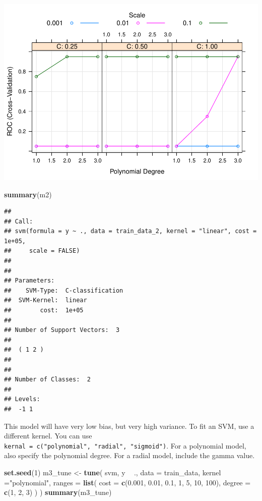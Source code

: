 \documentclass[
]{book}
\newenvironment{Shaded}{\begin{snugshade}}{\end{snugshade}}
\newcommand{\DataTypeTok}[1]{\textcolor[rgb]{0.13,0.29,0.53}{#1}}
\newcommand{\DecValTok}[1]{\textcolor[rgb]{0.00,0.00,0.81}{#1}}
\newcommand{\FloatTok}[1]{\textcolor[rgb]{0.00,0.00,0.81}{#1}}
\newcommand{\KeywordTok}[1]{\textcolor[rgb]{0.13,0.29,0.53}{\textbf{#1}}}
\newcommand{\NormalTok}[1]{#1}
\newcommand{\OperatorTok}[1]{\textcolor[rgb]{0.81,0.36,0.00}{\textbf{#1}}}
\newcommand{\StringTok}[1]{\textcolor[rgb]{0.31,0.60,0.02}{#1}}
\begin{document}
\includegraphics{data-sci_files/figure-latex/unnamed-chunk-106-1.pdf}

\begin{Shaded}
\begin{Highlighting}[]
\KeywordTok{summary}\NormalTok{(m2)}
\end{Highlighting}
\end{Shaded}

\begin{verbatim}
## 
## Call:
## svm(formula = y ~ ., data = train_data_2, kernel = "linear", cost = 1e+05, 
##     scale = FALSE)
## 
## 
## Parameters:
##    SVM-Type:  C-classification 
##  SVM-Kernel:  linear 
##        cost:  1e+05 
## 
## Number of Support Vectors:  3
## 
##  ( 1 2 )
## 
## 
## Number of Classes:  2 
## 
## Levels: 
##  -1 1
\end{verbatim}

This model will have very low bias, but very high variance. To fit an SVM, use a different kernel. You can use \texttt{kernal\ =\ c("polynomial",\ "radial",\ "sigmoid")}. For a polynomial model, also specify the polynomial degree. For a radial model, include the gamma value.

\begin{Shaded}
\begin{Highlighting}[]
\KeywordTok{set.seed}\NormalTok{(}\DecValTok{1}\NormalTok{)}
\NormalTok{m3_tune <-}\StringTok{ }\KeywordTok{tune}\NormalTok{(}
\NormalTok{  svm,}
\NormalTok{  y }\OperatorTok{~}\StringTok{ }\NormalTok{.,}
  \DataTypeTok{data =}\NormalTok{ train_data,}
  \DataTypeTok{kernel =}\StringTok{"polynomial"}\NormalTok{,}
  \DataTypeTok{ranges =} \KeywordTok{list}\NormalTok{(}
    \DataTypeTok{cost =} \KeywordTok{c}\NormalTok{(}\FloatTok{0.001}\NormalTok{, }\FloatTok{0.01}\NormalTok{, }\FloatTok{0.1}\NormalTok{, }\DecValTok{1}\NormalTok{, }\DecValTok{5}\NormalTok{, }\DecValTok{10}\NormalTok{, }\DecValTok{100}\NormalTok{),}
    \DataTypeTok{degree =} \KeywordTok{c}\NormalTok{(}\DecValTok{1}\NormalTok{, }\DecValTok{2}\NormalTok{, }\DecValTok{3}\NormalTok{)}
\NormalTok{  )}
\NormalTok{)}
\KeywordTok{summary}\NormalTok{(m3_tune)}
\end{Highlighting}
\end{Shaded}
\end{document}
